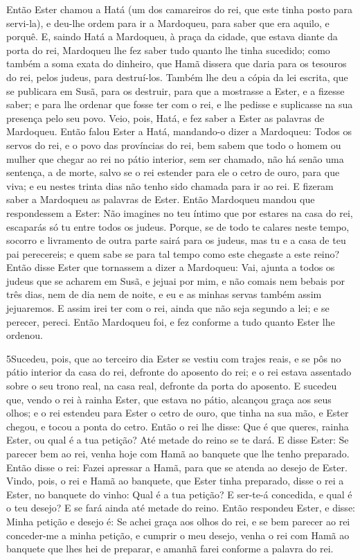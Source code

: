 Então Ester chamou a Hatá (um dos camareiros do rei, que este
tinha posto para servi-la), e deu-lhe ordem para ir a Mardoqueu,
para saber que era aquilo, e porquê. E, saindo Hatá a Mardoqueu,
à praça da cidade, que estava diante da porta do rei, Mardoqueu
lhe fez saber tudo quanto lhe tinha sucedido; como também a soma
exata do dinheiro, que Hamã dissera que daria para os tesouros do
rei, pelos judeus, para destruí-los. Também lhe deu a cópia da
lei escrita, que se publicara em Susã, para os destruir, para que a
mostrasse a Ester, e a fizesse saber; e para lhe ordenar que fosse
ter com o rei, e lhe pedisse e suplicasse na sua presença pelo seu
povo. Veio, pois, Hatá, e fez saber a Ester as palavras de
Mardoqueu. Então falou Ester a Hatá, mandando-o dizer a
Mardoqueu: Todos os servos do rei, e o povo das províncias do
rei, bem sabem que todo o homem ou mulher que chegar ao rei no pátio
interior, sem ser chamado, não há senão uma sentença, a de morte,
salvo se o rei estender para ele o cetro de ouro, para que viva; e
eu nestes trinta dias não tenho sido chamada para ir ao rei.
E fizeram saber a Mardoqueu as palavras de Ester.
Então Mardoqueu mandou que respondessem a Ester: Não imagines
no teu íntimo que por estares na casa do rei, escaparás só tu entre
todos os judeus. Porque, se de todo te calares neste tempo,
socorro e livramento de outra parte sairá para os judeus, mas tu e a
casa de teu pai perecereis; e quem sabe se para tal tempo como este
chegaste a este reino? Então disse Ester que tornassem a
dizer a Mardoqueu: Vai, ajunta a todos os judeus que se
acharem em Susã, e jejuai por mim, e não comais nem bebais por três
dias, nem de dia nem de noite, e eu e as minhas servas também assim
jejuaremos. E assim irei ter com o rei, ainda que não seja segundo a
lei; e se perecer, pereci. Então Mardoqueu foi, e fez
conforme a tudo quanto Ester lhe ordenou.

\medskip

\lettrine{5} Sucedeu, pois, que ao terceiro dia Ester se
vestiu com trajes reais, e se pôs no pátio interior da casa do rei,
defronte do aposento do rei; e o rei estava assentado sobre o seu
trono real, na casa real, defronte da porta do aposento. E
sucedeu que, vendo o rei à rainha Ester, que estava no pátio,
alcançou graça aos seus olhos; e o rei estendeu para Ester o cetro
de ouro, que tinha na sua mão, e Ester chegou, e tocou a ponta do
cetro. Então o rei lhe disse: Que é que queres, rainha Ester, ou
qual é a tua petição? Até metade do reino se te dará. E disse
Ester: Se parecer bem ao rei, venha hoje com Hamã ao banquete que
lhe tenho preparado. Então disse o rei: Fazei apressar a Hamã,
para que se atenda ao desejo de Ester. Vindo, pois, o rei e Hamã ao
banquete, que Ester tinha preparado, disse o rei a Ester, no
banquete do vinho: Qual é a tua petição? E ser-te-á concedida, e
qual é o teu desejo? E se fará ainda até metade do reino. Então
respondeu Ester, e disse: Minha petição e desejo é: Se achei
graça aos olhos do rei, e se bem parecer ao rei conceder-me a minha
petição, e cumprir o meu desejo, venha o rei com Hamã ao banquete
que lhes hei de preparar, e amanhã farei conforme a palavra do rei.

